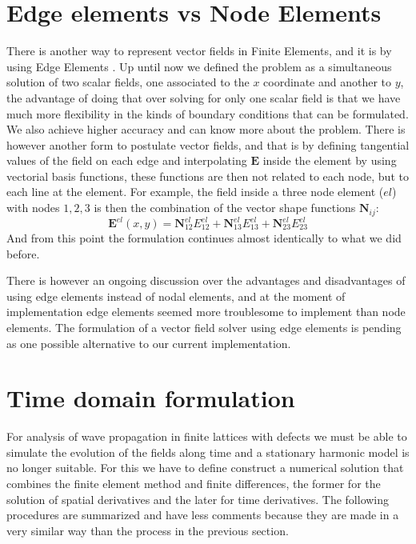 \section{Edge elements vs Node Elements}
There is another way to represent vector fields in Finite Elements, and it is by using Edge Elements \cite{Jin2010}. Up until now we defined the problem as a simultaneous solution of two scalar fields, one associated to the $x$ coordinate and another to $y$, the advantage of doing that over solving for only one scalar field is that we have much more flexibility in the kinds of boundary conditions that can be formulated. We also achieve higher accuracy and can know more about the problem. 
There is  however another form to postulate vector fields, and that is by defining tangential values of the field on each edge and interpolating $\mathbf{E}$ inside the element by using vectorial basis functions, these functions are then not related to each node, but to each line at the element. For example, the field inside  a three node element ($el$) with nodes $1,2,3$ is then the combination of the vector shape functions $\mathbf{N}_{ij}$:
\begin{equation}
\mathbf{E}^{el}(x,y) =\mathbf{N}_{12}^{el}E_{12}^{el} + \mathbf{N}_{13}^{el}E_{13}^{el}+ \mathbf{N}_{23}^{el}E_{23}^{el}
\end{equation}
And from this point the formulation continues almost identically to what we did before.

There is however an ongoing discussion \cite{Mur1994,Webb1993,Gerr1998} over the advantages and disadvantages of using edge elements instead of nodal elements, and at the moment of implementation edge elements seemed more troublesome to implement than node elements. The formulation of a vector field solver using edge elements is pending as one possible alternative to our current implementation.
\section{Time domain formulation}
For analysis of wave propagation in finite lattices with defects we must be able to simulate the evolution of the fields along time and a stationary harmonic model is no longer suitable. For this we have to define construct a numerical solution that combines the finite element method and finite differences, the former for the solution of spatial derivatives and the later for time derivatives.
The following procedures are summarized and have less comments because they are made in a very similar way than the process in the previous section.
